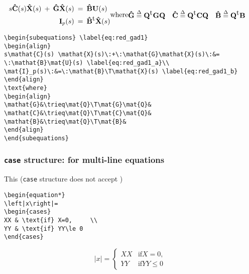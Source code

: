 %
\begin{subequations} \label{eq:red_gad1}
	\begin{align}
		s\mathat{C}(s) \mathat{X}(s)\:+\:\mathat{G}\mathat{X}(s)\:&=\:\mathat{B}\mat{U}(s) \label{eq:red_gad1_a}\\
		\mat{I}_p(s)\:&=\:\mathat{B}\T\mathat{X}(s) \label{eq:red_gad1_b}
	\end{align}
	\text{where}	
	\begin{align}
		\mathat{G}&\trieq\mat{Q}\T\mat{G}\mat{Q}&
		\mathat{C}&\trieq\mat{Q}\T\mat{C}\mat{Q}&
		\mathat{B}&\trieq\mat{Q}\T\mat{B}&
	\end{align}
\end{subequations}
%
%
\begin{verbatim}
\begin{subequations} \label{eq:red_gad1}
\begin{align}
s\mathat{C}(s) \mathat{X}(s)\:+\:\mathat{G}\mathat{X}(s)\:&=
\:\mathat{B}\mat{U}(s) \label{eq:red_gad1_a}\\
\mat{I}_p(s)\:&=\:\mathat{B}\T\mathat{X}(s) \label{eq:red_gad1_b}
\end{align}
\text{where}	
\begin{align}
\mathat{G}&\trieq\mat{Q}\T\mat{G}\mat{Q}&
\mathat{C}&\trieq\mat{Q}\T\mat{C}\mat{Q}&
\mathat{B}&\trieq\mat{Q}\T\mat{B}&
\end{align}
\end{subequations}
\end{verbatim}
%
\subsubsection{\texttt{\Large case} structure: for multi-line equations}
This (\texttt{case} structure does not accept \texttt{\label{}})
%
%
\begin{verbatim}
\begin{equation*}
\left|x\right|= 
\begin{cases} 
XX & \text{if} X=0,     \\
YY & \text{if} YY\le 0  
\end{cases}
\end{verbatim}
%
%
\begin{equation*}
\left|x\right|= 
\begin{cases} 
XX & \text{if} X=0,     \\
YY & \text{if} YY\le 0  
\end{cases}
\end{equation*}
%
%
